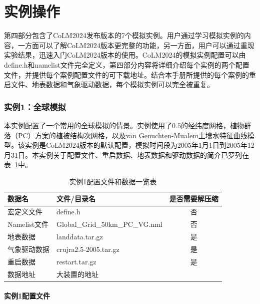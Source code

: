 \part{实例操作}

第四部分包含了CoLM2024发布版本的7个模拟实例。用户通过学习模拟实例的内容，一方面可以了解CoLM2024版本更完整的功能，另一方面，用户可以通过重现实验结果，迅速入门CoLM2024版本的使用。CoLM2024的模拟实例配置可以由define.h和namelist文件完全定义，第四部分内容将详细介绍每个实例的两个配置文件，并提供每个案例配置文件的可下载地址。结合本手册所提供的每个案例的重启文件、地表数据和气象驱动数据，每个模拟实例可以完全被重复。

\section{实例1：全球模拟}

本实例配置了一个常用的全球模拟的情景。实例使用了0.5\textdegree 的经纬度网格，植物群落（PC）方案的植被结构次网格，以及van Genuchten-Mualem土壤水特征曲线模型。该实例是CoLM2024版本的默认配置，模拟时间段为2005年1月1日到2005年12月31日。本实例关于配置文件、重启数据、地表数据和驱动数据的简介已罗列在表~\ref{ex1table}中。

\begin{table}[htbp]
\caption{实例1配置文件和数据一览表}
\centering \renewcommand{\arraystretch}{1.5}
\label{ex1table}
\begin{tabular}{llc}
\toprule
\textbf{数据名} & \textbf{文件/目录名} & \textbf{是否需要解压缩} \\\midrule

宏定义文件 & define.h & 否 \\
Namelist文件 & Global\_Grid\_50km\_PC\_VG.nml & 否 \\
地表数据 & landdata.tar.gz & 是 \\
气象驱动数据 & crujra2.5-2005.tar.gz & 是 \\
重启数据 & restart.tar.gz & 是 \\

\midrule

数据地址 & \multicolumn{2}{l}{大装置的地址}\\
\bottomrule
\end{tabular}
\end{table}


\subsection{实例1配置文件}\label{ex1config}

